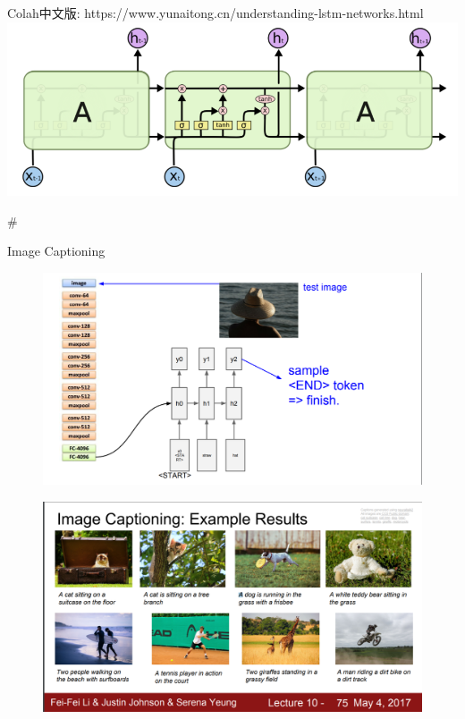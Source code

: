 \documentclass[11pt]{article}
\makeatletter
\def\maxwidth{\ifdim\Gin@nat@width>\linewidth\linewidth
    \else\Gin@nat@width\fi}
\let\Oldincludegraphics\includegraphics
\renewcommand{\includegraphics}[1]{\Oldincludegraphics[width=.8\maxwidth]{#1}}
\makeatother
\begin{document}
Colah中文版: https://www.yunaitong.cn/understanding-lstm-networks.html
\includegraphics{lstm.png}

    \#

Image Captioning

\begin{figure}
\centering
\includegraphics{rnn_straw.png}
\caption{}
\end{figure}

    \begin{figure}
\centering
\includegraphics{image_caption.png}
\caption{}
\end{figure}
\end{document}
